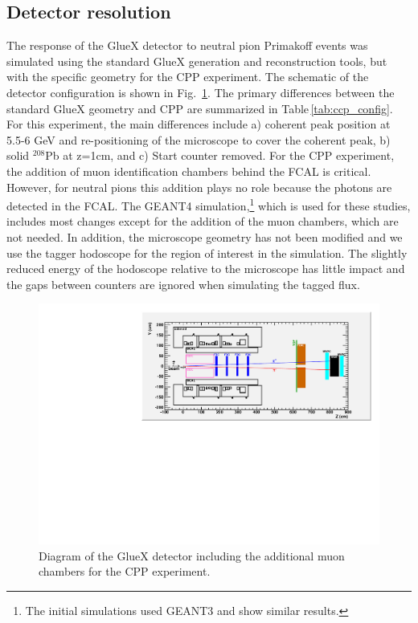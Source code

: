 \subsection{Detector resolution}
\label{sec:acceptance}
The response of the GlueX detector to neutral pion Primakoff events
was simulated using the standard GlueX generation and reconstruction
tools, but with the specific geometry for the CPP experiment. The schematic of the detector configuration is shown in
Fig.~\ref{fig:GlueX_cpp}. The primary differences between the
standard GlueX geometry and CPP are summarized in
Table\,\ref{tab:ccp_config}. For this experiment, the main differences
include a) coherent peak position at 5.5-6 GeV and re-positioning of
the microscope to cover the coherent peak, b) solid $^{208}$Pb at
z=1cm, and c) Start counter removed. For the CPP experiment, the
addition of muon identification chambers behind the FCAL is
critical. However, for neutral pions this addition plays no role
because the photons are detected in the FCAL. The GEANT4 simulation,\footnote{The initial simulations used GEANT3
and show similar results.}
which is used for these studies, includes most changes except for the
addition of the muon chambers, which are not needed. In addition, the
microscope geometry has not been modified and we use the tagger
hodoscope for the region of interest in the simulation. The slightly reduced
energy of the hodoscope relative to the microscope has little impact
and the gaps between counters are ignored when simulating the tagged
flux.
\begin{figure}[h!]
\centering
\includegraphics[width=5.25in]{figures/GlueX_cpp.pdf}
\caption{Diagram of the GlueX detector including the additional muon chambers for the CPP experiment.}
\label{fig:GlueX_cpp}
\end{figure}

